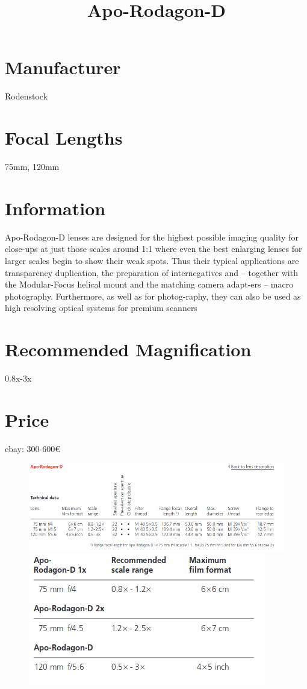 \documentclass{article}
\begin{document}
\usepackage{titlesec}
\usepackage{graphicx}


\title{Apo-Rodagon-D}
\section{Manufacturer}
Rodenstock
\section{Focal Lengths}
75mm, 120mm
\section{Information}

Apo-Rodagon-D lenses are designed for the highest possible imaging quality for close-ups at just those scales around 1:1 where even the best enlarging lenses for larger scales begin to show their weak spots. Thus their typical applications are transparency duplication, the preparation of internegatives and – together with the Modular-Focus helical mount and the matching camera adapt-ers – macro photography. Furthermore, as well as for photog-raphy, they can also be used as high resolving optical systems for premium scanners

\section{Recommended Magnification}
0.8x-3x
\section{Price}

ebay: 300-600€

\begin{figure}
\centering
\includegraphics[width=\textwidth]{apo-rodagon-d-1.png}
\includegraphics[width=\textwidth]{apo-rodagon-d-2.png}
\end{figure}
\end{document}
